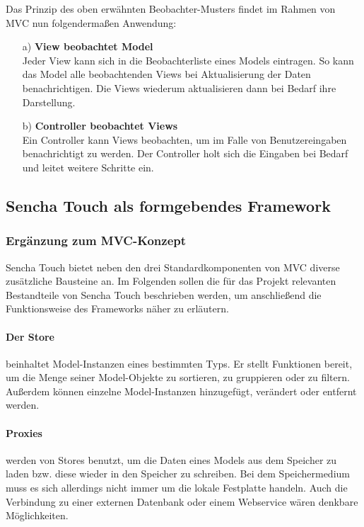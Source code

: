 Das Prinzip des oben erwähnten Beobachter-Musters findet im Rahmen von MVC nun folgendermaßen Anwendung: 
\begin{itemize}
	\item[a)] \textbf{View beobachtet Model}\\
	Jeder View kann sich in die Beobachterliste eines Models eintragen. So kann das Model alle beobachtenden Views bei Aktualisierung der Daten benachrichtigen. Die Views wiederum aktualisieren dann bei Bedarf ihre Darstellung.
	\item[b)] \textbf{Controller beobachtet Views}\\
	Ein Controller kann Views beobachten, um im Falle von Benutzereingaben benachrichtigt zu werden. Der Controller holt sich die Eingaben bei Bedarf und leitet weitere Schritte ein.
\end{itemize}

\subsection{Sencha Touch als formgebendes Framework}
\subsubsection*{Ergänzung zum MVC-Konzept}
Sencha Touch bietet neben den drei Standardkomponenten von MVC diverse zusätzliche Bausteine an. Im Folgenden sollen die für das Projekt relevanten Bestandteile von Sencha Touch beschrieben werden, um anschließend die Funktionsweise des Frameworks näher zu erläutern.

\paragraph{Der Store} beinhaltet Model-Instanzen eines bestimmten Typs. Er stellt Funktionen bereit, um die Menge seiner Model-Objekte zu sortieren, zu gruppieren oder zu filtern. Außerdem können einzelne Model-Instanzen hinzugefügt, verändert oder entfernt werden.

\paragraph{Proxies }werden von Stores benutzt, um die Daten eines Models aus dem Speicher zu laden bzw. diese wieder in den Speicher zu schreiben. Bei dem Speichermedium muss es sich allerdings nicht immer um die lokale Festplatte handeln. Auch die Verbindung zu einer externen Datenbank oder einem Webservice wären denkbare Möglichkeiten.

